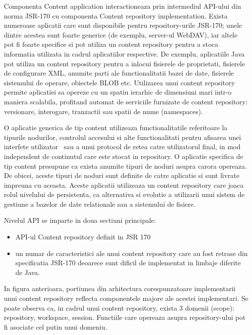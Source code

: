 \bigskip

Componenta Content application interactioneaza prin intermediul API-ului din norma JSR-170 cu componenta Content repository implementation. Exista numeroase aplicatii care sunt disponibile pentru repository{}-urile JSR-170; unele dintre acestea sunt foarte generice (de exemplu, server-ul WebDAV), iar altele pot fi foarte specifice si pot utiliza un content repository pentru a stoca informatia utilizata in cadrul aplicatiilor respective. De exemplu, aplicatiile Java pot utiliza un content repository pentru a inlocui fisierele de proprietati, fisierele de configurare XML, anumite parti ale functionalitatii bazei de date, fisierele sistemului de operare, obiectele BLOB etc. Utilizarea unui content repository permite aplicatiei sa opereze cu un spatiu ierarhic de dimensiuni mari intr-o maniera scalabila, profitand automat de serviciile furnizate de content repository: versionare, interogare, tranzactii sau spatii de nume (namespaces). 

\bigskip

O aplicatie generica de tip content utilizeaza functionalitatile referitoare la tipurile nodurilor, controlul accesului si alte functionalitati pentru afisarea unei interfete utilizator \ sau a unui protocol de retea catre utilizatorul final, in mod independent de continutul care este stocat in repository. O aplicatie specifica de tip content presupune ca exista anumite tipuri de noduri asupra carora opereaza. De obicei, aceste tipuri de noduri sunt definite de catre aplicatie si sunt livrate impreuna cu aceasta. Aceste aplicatii utilizeaza un content repository care joaca rolul nivelului de persistenta, ca alternativa si evolutie a utilizarii unui sistem de gestiune a bazelor de date relationale sau a sistemului de fisiere.

\bigskip

Nivelul API se imparte in doua sectiuni principale:

\begin{itemize}
\item API-ul Content repository definit in JSR 170
\item un numar de caracteristici ale unui content repository care au fost retrase din specificatia JSR-170 deoarece sunt dificil de implementat in limbaje diferite de Java. \ \ \ 
\end{itemize}

\bigskip
  
In figura anterioara, portiunea din arhitectura corespunzatoare implementarii unui content repository reflecta componentele majore ale acestei implementari. Se poate observa ca, in cadrul unui content repository, exista 3 domenii (scope): repository, workspace, session. Functiile care opereaza asupra repository{}-ului pot fi asociate cel putin unui domeniu.


